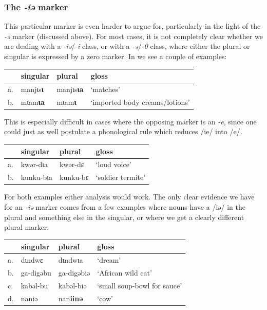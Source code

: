 \subsubsection{The \textit{-iə} marker}

This particular marker is even harder to argue for, particularly in the light of the \textit{-ə} marker (discussed above). For most cases, it is not completely clear whether we are dealing with a \textit{-iə}/\textit{-i} class, or with a \textit{-ə}/\textit{-0} class, where either the plural or singular is expressed by a zero marker. In  we see a couple of examples:

\begin{exe}
    \ex \label{ia-kazem}
    \begin{tabular}[t]{llll}
      & singular & plural   & gloss                          \\
      \midrule
      a. & manjɩs\textbf{ɩ}  & manjɩs\textbf{ɩa} & `matches'                      \\
      b. & mɩam\textbf{ɩa}   & mɩam\textbf{ɩ}    & `imported body creams/lotions' \\
    \end{tabular}
\end{exe}

This is especially difficult in cases where the opposing marker is an \textit{-e}, since one could just as well postulate a phonological rule which reduces /ie/ into /e/.

\begin{exe}
    \ex \label{ia2-kazem}
    \begin{tabular}[t]{llll}
      & singular  & plural   & gloss             \\
      \midrule
      a. & kwər-dɩa  & kwər-dɛ  & `loud voice'      \\
      b. & kunku-bɩa & kunku-bɛ & `soldier termite' \\
    \end{tabular}
\end{exe}

For both examples either analysis would work. The only clear evidence we have for an \textit{-iə} marker comes from a few examples where nouns have a /iə/ in the plural and something else in the singular, or where we get a clearly different plural marker:

\begin{exe}
    \ex
    \begin{tabular}[t]{llll}
      & singular  & plural           & gloss                       \\
      \midrule
      a. & dɩndwɛ    & dɩndwɩa          & `dream'                     \\
      b. & ga-digəbu & ga-digəbiə       & `African wild cat'          \\
      c. & kabəl-bu  & kabəl-biə        & `small soup-bowl for sauce' \\
      d. & naniə    & nan\textbf{iinə} & `cow'                       \\
    \end{tabular}
\end{exe}

